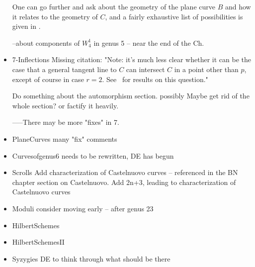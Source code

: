 \documentclass[12pt, leqno]{book}
\begin{document}
\begin{itemize}
 One can go further and ask about the geometry of the plane curve $B$ and how it relates to the geometry of $C$, and a fairly exhaustive list of possibilities is given in \cite{ACGH}. 

--about components of $W^1_4$ in genus 5 -- near the end of the Ch.

\item{7-Inflections}  Missing citation: "Note: it's much less clear whether it can be the case that a general tangent line to $C$ can intersect $C$ in a point other than $p$, except of course in case $r=2$. See~\cite{} for results on this question."

Do something about the automorphism section.  possibly 
Maybe get rid of the whole section? or factify it heavily.

-----There may be more "fixes" in 7.

\item{PlaneCurves}
many "fix" comments

\item{Curvesofgenus6}
needs to be rewritten, DE has begun

\item{Scrolls}
Add characterization of Castelnuovo curves -- referenced in the BN chapter section on Castelnuovo.
Add 2n+3, leading to characterization of Castelnuovo curves
\item{Moduli}
consider moving early -- after genus 23

\item{HilbertSchemes}
\item{HilbertSchemesII}

\item{Syzygies}
DE to think through what should be there

\end{itemize}
\end{document}

